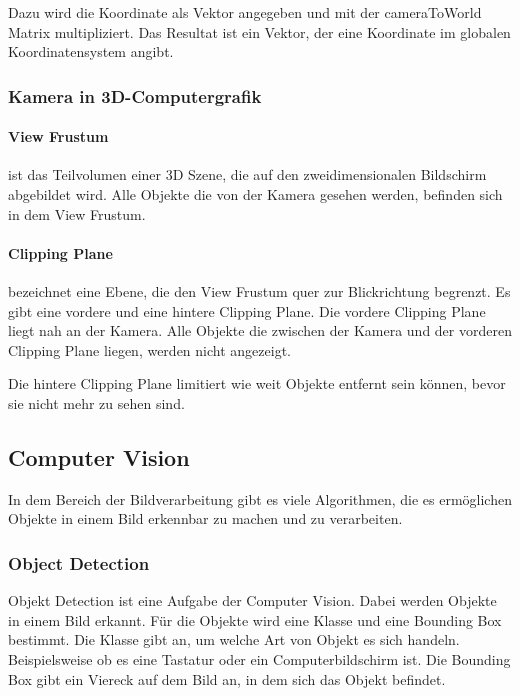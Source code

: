 Dazu wird die Koordinate als Vektor angegeben und mit der cameraToWorld Matrix multipliziert. Das Resultat ist ein Vektor, der eine Koordinate im globalen Koordinatensystem angibt.\citep{unitycameratoworldmatrix,unitymultiplyoint}

\subsubsection{Kamera in 3D-Computergrafik}
\paragraph{View Frustum}
ist das Teilvolumen einer 3D Szene, die auf den zweidimensionalen Bildschirm abgebildet wird. Alle Objekte die von der Kamera gesehen werden, befinden sich in dem View Frustum.

\paragraph{Clipping Plane}
bezeichnet eine Ebene, die den View Frustum quer zur Blickrichtung begrenzt. 
Es gibt eine vordere und eine hintere Clipping Plane.
Die vordere Clipping Plane liegt nah an der Kamera. Alle Objekte die zwischen der Kamera und der vorderen Clipping Plane liegen, werden nicht angezeigt.

Die hintere Clipping Plane limitiert wie weit Objekte entfernt sein können, bevor sie nicht mehr zu sehen sind.


\subsection{Computer Vision}
In dem Bereich der Bildverarbeitung gibt es viele Algorithmen, die es ermöglichen Objekte in einem Bild erkennbar zu machen und zu verarbeiten.

\subsubsection{Object Detection}
Objekt Detection ist eine Aufgabe der Computer Vision. Dabei werden Objekte in einem Bild erkannt. 
Für die Objekte wird eine Klasse und eine Bounding Box bestimmt. 
Die Klasse gibt an, um welche Art von Objekt es sich handeln. Beispielsweise ob es eine Tastatur oder ein Computerbildschirm ist.
Die Bounding Box gibt ein Viereck auf dem Bild an, in dem sich das Objekt befindet.



